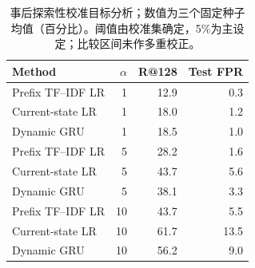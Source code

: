\begin{table}[t]
\centering\footnotesize
\caption{事后探索性校准目标分析；数值为三个固定种子均值（百分比）。阈值由校准集确定，5\%为主设定；比较区间未作多重校正。}\label{tab:review_sensitivity}
\begin{tabular}{lrrr}\toprule
Method & $\alpha$ & R@128 & Test FPR \\
\midrule
Prefix TF--IDF LR & 1 & 12.9 & 0.3 \\
Current-state LR & 1 & 18.0 & 1.2 \\
Dynamic GRU & 1 & 18.5 & 1.0 \\
Prefix TF--IDF LR & 5 & 28.2 & 1.6 \\
Current-state LR & 5 & 43.7 & 5.6 \\
Dynamic GRU & 5 & 38.1 & 3.3 \\
Prefix TF--IDF LR & 10 & 43.7 & 5.5 \\
Current-state LR & 10 & 61.7 & 13.5 \\
Dynamic GRU & 10 & 56.2 & 9.0 \\
\bottomrule\end{tabular}
\end{table}

